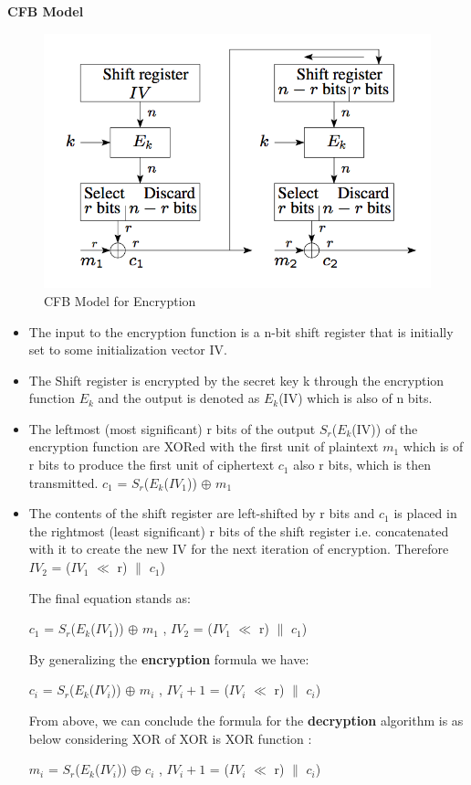 \documentclass{article}
\begin{document}
\bigskip
\textbf{CFB Model}
\begin{figure}[h!]
\centering
\includegraphics[scale=0.5]{CFB_mode.png}
\caption{CFB Model for Encryption}
\label{fig:aesni_output_in_c}
\end{figure}
\begin{itemize}
\item The input to the encryption function is a n-bit shift register that is initially set to some initialization vector IV.

\item The Shift register is encrypted by the secret key k through the encryption function $E_k$ and the output is denoted as $E_k$(IV) which is also of n bits.

\item The leftmost (most significant) r bits of the output $S_r$($E_k$(IV)) of the encryption function are XORed with the first unit of plaintext $m_1$ which is of r bits to produce the first unit of ciphertext $c_1$ also r bits, which is then transmitted. 
$c_1$ = $S_r$($E_k$($IV_1$)) $\oplus$ $m_1$

\item The contents of the shift register are left-shifted by r bits and $c_1$ is placed
in the rightmost (least significant) r bits of the shift register i.e. concatenated with it to create the new IV for the next iteration of encryption. Therefore $IV_2$ = ($IV_1$ $\ll$ r) $\|$ $c_1$)

The final equation stands as:

$c_1$ = $S_r$($E_k$($IV_1$)) $\oplus$ $m_1$ , $IV_2$ = ($IV_1$ $\ll$ r) $\|$ $c_1$)

By generalizing the \textbf{encryption} formula we have:

$c_i$ = $S_r$($E_k$($IV_i$)) $\oplus$ $m_i$ , $IV_i+1$ = ($IV_i$ $\ll$ r) $\|$ $c_i$)

From above, we can conclude the formula for the \textbf{decryption} algorithm is as below considering XOR of XOR is XOR function :

$m_i$ = $S_r$($E_k$($IV_i$)) $\oplus$ $c_i$ , $IV_i+1$ = ($IV_i$ $\ll$ r) $\|$ $c_i$)

\end{itemize}
\end{document}
